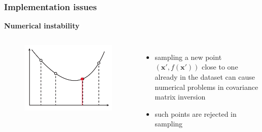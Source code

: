 \documentclass[sans,mathserif]{beamer}
\newcommand{\xx}{\mathrm{\mathbf{x}}}
\begin{document}
\begin{frame}
  \frametitle{Implementation issues}
  \textbf{Numerical instability}
  \begin{columns}[T]
  \column{5cm}
    \begin{figure}
    \includegraphics[width=\linewidth]{img/numerical-instability}
    \end{figure}
  \column{5.5cm}
    \begin{itemize}
      \item sampling a new point $(\xx', f(\xx'))$ close to one already in
          the dataset can cause numerical problems in covariance matrix inversion
      \item such points are rejected in sampling
    \end{itemize}
  \end{columns}
\end{frame}
\end{document}
